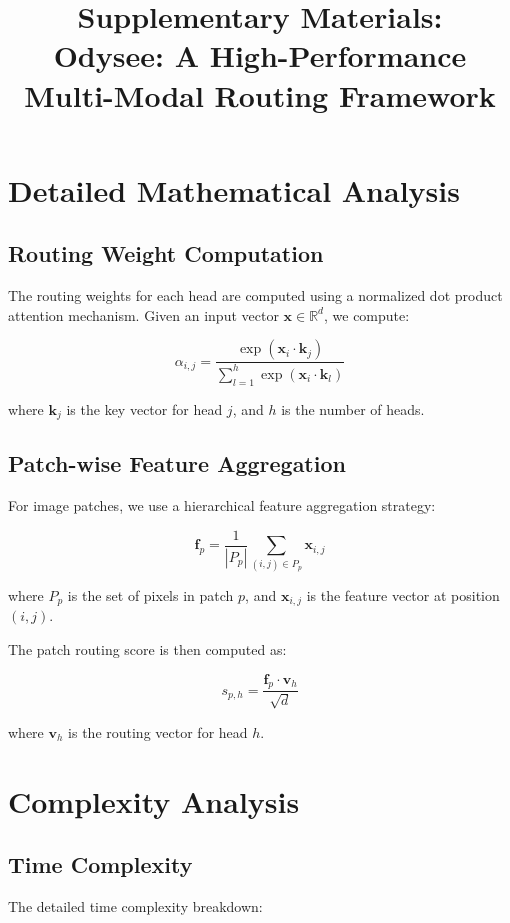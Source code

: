 \documentclass[10pt]{article}
\title{Supplementary Materials: \\
Odysee: A High-Performance Multi-Modal Routing Framework}
\begin{document}
\maketitle

\section{Detailed Mathematical Analysis}

\subsection{Routing Weight Computation}
The routing weights for each head are computed using a normalized dot product attention mechanism. Given an input vector $\mathbf{x} \in \mathbb{R}^d$, we compute:

\begin{equation}
    \alpha_{i,j} = \frac{\exp(\mathbf{x}_i \cdot \mathbf{k}_j)}{\sum_{l=1}^h \exp(\mathbf{x}_i \cdot \mathbf{k}_l)}
\end{equation}

where $\mathbf{k}_j$ is the key vector for head $j$, and $h$ is the number of heads.

\subsection{Patch-wise Feature Aggregation}
For image patches, we use a hierarchical feature aggregation strategy:

\begin{equation}
    \mathbf{f}_p = \frac{1}{|P_p|} \sum_{(i,j) \in P_p} \mathbf{x}_{i,j}
\end{equation}

where $P_p$ is the set of pixels in patch $p$, and $\mathbf{x}_{i,j}$ is the feature vector at position $(i,j)$.

The patch routing score is then computed as:

\begin{equation}
    s_{p,h} = \frac{\mathbf{f}_p \cdot \mathbf{v}_h}{\sqrt{d}}
\end{equation}

where $\mathbf{v}_h$ is the routing vector for head $h$.

\section{Complexity Analysis}

\subsection{Time Complexity}
The detailed time complexity breakdown:
\end{document}
